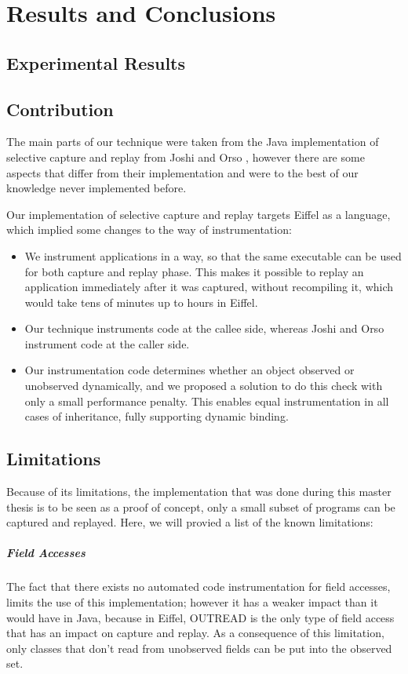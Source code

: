 \chapter{Results and Conclusions}

\section{Experimental Results}


\section{Contribution}
The main parts of our technique were taken from the Java implementation of selective capture and replay from Joshi and Orso \cite{orso05may}, however there are some aspects that differ from their implementation and were to the best of our knowledge never implemented before.

Our implementation of selective capture and replay targets Eiffel as a language, which implied some changes to the way of instrumentation:
\begin{itemize}
\item We instrument applications in a way, so that the same executable can be used for both capture and replay phase. This makes it possible to replay an application immediately after it was captured, without recompiling it, which would take tens of minutes up to hours in Eiffel.
\item Our technique instruments code at the callee side, whereas Joshi and Orso instrument code at the caller side. 
\item Our instrumentation code determines whether an object observed or unobserved dynamically, and we proposed a solution to do this check with only a small performance penalty. This enables equal instrumentation in all cases of inheritance, fully supporting dynamic binding. 
\end {itemize}

\section {Limitations}
Because of its limitations, the implementation that was done during this master thesis is to be seen as a proof of concept, only a small subset of programs can be captured and replayed. Here, we will provied a list of the known limitations:

\paragraph{Field Accesses}
The fact that there exists no automated code instrumentation for field accesses, limits the use of this implementation; however it has a weaker impact than it would have in Java, because in Eiffel, OUTREAD is the only type of field access that has an impact on capture and replay. As a consequence of this limitation, only classes that don't read from unobserved fields can be put into the observed set.

